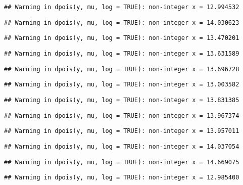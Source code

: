 \documentclass[
]{article}
\begin{document}
\begin{verbatim}
## Warning in dpois(y, mu, log = TRUE): non-integer x = 12.994532
\end{verbatim}

\begin{verbatim}
## Warning in dpois(y, mu, log = TRUE): non-integer x = 14.030623
\end{verbatim}

\begin{verbatim}
## Warning in dpois(y, mu, log = TRUE): non-integer x = 13.470201
\end{verbatim}

\begin{verbatim}
## Warning in dpois(y, mu, log = TRUE): non-integer x = 13.631589
\end{verbatim}

\begin{verbatim}
## Warning in dpois(y, mu, log = TRUE): non-integer x = 13.696728
\end{verbatim}

\begin{verbatim}
## Warning in dpois(y, mu, log = TRUE): non-integer x = 13.003582
\end{verbatim}

\begin{verbatim}
## Warning in dpois(y, mu, log = TRUE): non-integer x = 13.831385
\end{verbatim}

\begin{verbatim}
## Warning in dpois(y, mu, log = TRUE): non-integer x = 13.967374
\end{verbatim}

\begin{verbatim}
## Warning in dpois(y, mu, log = TRUE): non-integer x = 13.957011
\end{verbatim}

\begin{verbatim}
## Warning in dpois(y, mu, log = TRUE): non-integer x = 14.037054
\end{verbatim}

\begin{verbatim}
## Warning in dpois(y, mu, log = TRUE): non-integer x = 14.669075
\end{verbatim}

\begin{verbatim}
## Warning in dpois(y, mu, log = TRUE): non-integer x = 12.985400
\end{verbatim}
\end{document}
